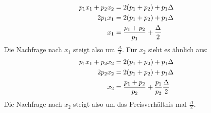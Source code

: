 \documentclass{article}
\begin{document}
\begin{enumerate}[label=(\alph*)]
		\begin{align}
			p_1x_1 + p_2x_2 &= 2(p_1+p_2) + p_1\Delta \notag \\
			2p_1x_1 &= 2(p_1+p_2) + p_1\Delta \notag \\
			x_1 &= \frac{p_1+p_2}{p_1} + \frac{\Delta}{2} \notag
		\end{align}
		Die Nachfrage nach $x_1$ steigt also um $\frac{\Delta}{2}$. Für $x_2$ sieht es ähnlich aus:
		\begin{align}
			p_1x_1 + p_2x_2 &= 2(p_1+p_2) + p_1\Delta \notag \\
			2p_2x_2 &= 2(p_1+p_2) + p_1\Delta \notag \\
			x_2 &= \frac{p_1+p_2}{p_2} + \frac{p_1}{p_2}\frac{\Delta}{2} \notag
		\end{align}
		Die Nachfrage nach $x_2$ steigt also um das Preisverhältnis mal $\frac{\Delta}{2}$.
	\end{enumerate}
	
\end{document}
